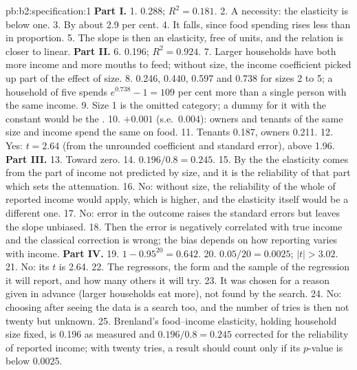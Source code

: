 \begin{solution}{pb:b2:specification:1}
\textbf{Part I.}
1. 0.288; $R^2 = 0.181$.
2. A necessity: the elasticity is below one.
3. By about 2.9 per cent.
4. It falls, since food spending rises less than in proportion.
5. The slope is then an elasticity, free of units, and the relation is closer to linear.
\textbf{Part II.}
6. 0.196; $R^2 = 0.924$.
7. Larger households have both more income and more mouths to feed; without size, the income coefficient picked up part
of the effect of size.
8. 0.246, 0.440, 0.597 and 0.738 for sizes 2 to 5; a household of five spends $e^{0.738} - 1 = 109$ per cent more than a
single person with the same income.
9. Size 1 is the omitted category; a dummy for it with the constant would be the .
10. $+0.001$ (s.e.\ 0.004): owners and tenants of the same size and income spend the same on food.
11. Tenants 0.187, owners 0.211.
12. Yes: $t = 2.64$ (from the unrounded coefficient and standard error), above 1.96.
\textbf{Part III.}
13. Toward zero.
14. $0.196/0.8 = 0.245$.
15. By the  the elasticity comes from the part of income not predicted by size, and it is the
reliability of that part which sets the attenuation.
16. No: without size, the reliability of the whole of reported income would apply, which is higher, and the elasticity
itself would be a different one.
17. No: error in the outcome raises the standard errors but leaves the slope unbiased.
18. Then the error is negatively correlated with true income and the classical correction is wrong; the bias depends on
how reporting varies with income.
\textbf{Part IV.}
19. $1 - 0.95^{20} = 0.642$.
20. $0.05/20 = 0.0025$; $|t| > 3.02$.
21. No: its $t$ is 2.64.
22. The regressors, the form and the sample of the regression it will report, and how many others it will try.
23. It was chosen for a reason given in advance (larger households eat more), not found by the search.
24. No: choosing after seeing the data is a search too, and the number of tries is then not twenty but unknown.
25. Brenland's food--income elasticity, holding household size fixed, is 0.196 as measured and $0.196/0.8 = 0.245$
corrected for the reliability of reported income; with twenty tries, a result should count only if its $p$-value is below
0.0025.
\end{solution}

